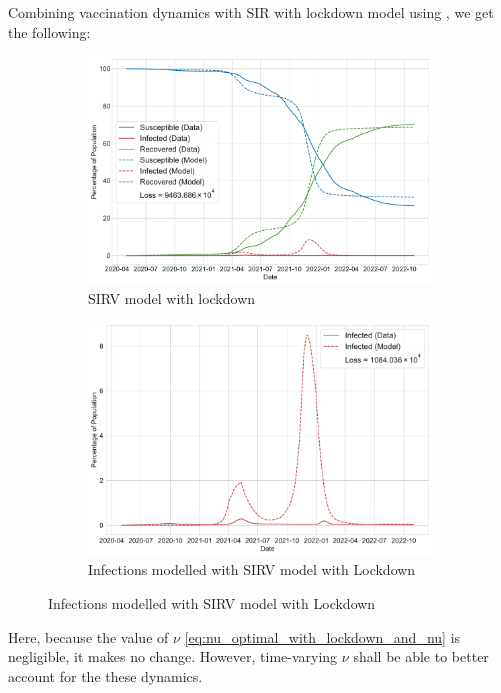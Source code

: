 \documentclass[tikz,fleqn,12pt]{wlscirep}
\begin{document}
Combining vaccination dynamics with SIR with lockdown model using , we get the following:
\begin{figure}[htbp!]
  \centering
  \caption{SIRV Model with lockdown for India}

  \begin{subfigure}[t]{\textwidth}
    \centering
    \includegraphics[scale=0.50]{images/SIRV_model_with_lockdown_IND.pdf}
    \caption{SIRV model with lockdown}
    \label{fig:SIRV_model_with_lockdown_IND}
  \end{subfigure}

  \begin{subfigure}[t]{\textwidth}
    \centering
    \includegraphics[scale=0.50]{images/SIRV_model_with_lockdown_infections_IND.pdf}
    \caption{Infections modelled with SIRV model with Lockdown}
    \label{fig:SIRV_model_with_lockdown_infections_IND}
  \end{subfigure}
\end{figure}
Here, because the value of $\nu$ \cref{eq:nu_optimal_with_lockdown_and_nu} is negligible, it makes no change. However, time-varying $\nu$ shall be able to better account for the these dynamics.
\end{document}
